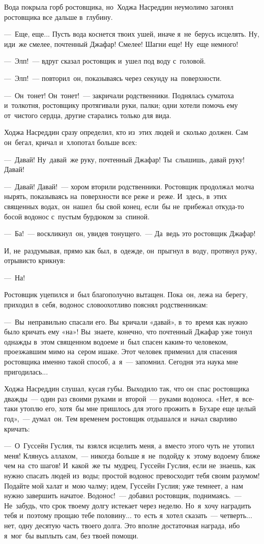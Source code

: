 \documentclass[12pt,a4paper]{book}
\begin{document}
Вода покрыла горб ростовщика, но~Ходжа Насреддин неумолимо загонял ростовщика все дальше в~глубину.

—~Еще, еще... Пусть вода коснется твоих ушей, иначе я~не~берусь исцелять. Ну, иди~же смелее, почтенный Джафар! Смелее! Шагни еще! Ну~еще немного!

—~Элп!~— вдруг сказал ростовщик и~ушел под воду с~головой.

—~Элп!~— повторил~он, показываясь через секунду на~поверхности.

—~Он~тонет! Он~тонет!~— закричали родственники. Поднялась суматоха и~толкотня, ростовщику протягивали руки, палки; одни хотели помочь ему от~чистого сердца, другие старались только для вида.

Ходжа Насреддин сразу определил, кто из~этих людей и~сколько должен. Сам он~бегал, кричал и~хлопотал больше всех:

—~Давай! Ну~давай~же руку, почтенный Джафар! Ты~слышишь, давай руку! Давай!

—~Давай! Давай!~— хором вторили родственники. Ростовщик продолжал молча нырять, показываясь на~поверхности все реже и~реже. И~здесь, в~этих священных водах, он~нашел~бы свой конец, если~бы не~прибежал откуда-то босой водонос с~пустым бурдюком за~спиной.

—~Ба!~— воскликнул~он, увидев тонущего.~— Да~ведь это ростовщик Джафар!

И, не~раздумывая, прямо как был, в~одежде, он~прыгнул в~воду, протянул руку, отрывисто крикнув:

—~На!

Ростовщик уцепился и~был благополучно вытащен. Пока~он, лежа на~берегу, приходил в~себя, водонос словоохотливо пояснял родственникам:

—~Вы~неправильно спасали его. Вы~кричали «давай», в~то~время как нужно было кричать ему «на»! Вы~знаете, конечно, что почтенный Джафар уже тонул однажды в~этом священном водоеме и~был спасен каким-то человеком, проезжавшим мимо на~сером ишаке. Этот человек применил для спасения ростовщика именно такой способ, а~я~— запомнил. Сегодня эта наука мне пригодилась...

Ходжа Насреддин слушал, кусая губы. Выходило так, что он~спас ростовщика дважды~— один раз своими руками и~второй~— руками водоноса. «Нет, я~все-таки утоплю его, хотя~бы мне пришлось для этого прожить в~Бухаре еще целый год»,~— думал~он. Тем временем ростовщик отдышался и~начал сварливо кричать:

—~О~Гуссейн Гуслия, ты~взялся исцелить меня, а~вместо этого чуть не~утопил меня! Клянусь аллахом,~— никогда больше я~не~подойду к~этому водоему ближе чем на~сто шагов! И~какой~же ты~мудрец, Гуссейн Гуслия, если не~знаешь, как нужно спасать людей из~воды; простой водонос превосходит тебя своим разумом! Подайте мой халат и~мою чалму; идем, Гуссейн Гуслия; уже темнеет, а~нам нужно завершить начатое. Водонос!~— добавил ростовщик, поднимаясь.~— Не~забудь, что срок твоему долгу истекает через неделю. Но~я~хочу наградить тебя и~поэтому прощаю тебе половину... то~есть я~хотел сказать~— четверть... нет, одну десятую часть твоего долга. Это вполне достаточная награда, ибо я~мог~бы выплыть сам, без твоей помощи.
\end{document}
